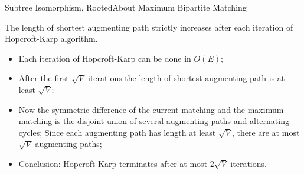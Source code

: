 \documentclass{beamer}
\begin{document}
\begin{frame}{Subtree Isomorphism, Rooted}{About Maximum Bipartite Matching}
\begin{lemma}
	 The length of shortest augmenting path strictly increases after each iteration of Hopcroft-Karp algorithm.
\end{lemma}

\pause

\begin{itemize}
	\item Each iteration of Hopcroft-Karp can be done in $O(E)$;
	\item After the first $\sqrt{V}$ iterations the length of shortest augmenting path is at least $\sqrt{V}$;
	\item Now the symmetric difference of the current matching and the maximum matching is the disjoint union of several augmenting paths and alternating cycles; Since each augmenting path has length at least $\sqrt{V}$, there are at most $\sqrt{V}$ augmenting paths;
	\item Conclusion: Hopcroft-Karp terminates after at most $2\sqrt{V}$ iterations.
\end{itemize}
\end{frame}
\end{document}
